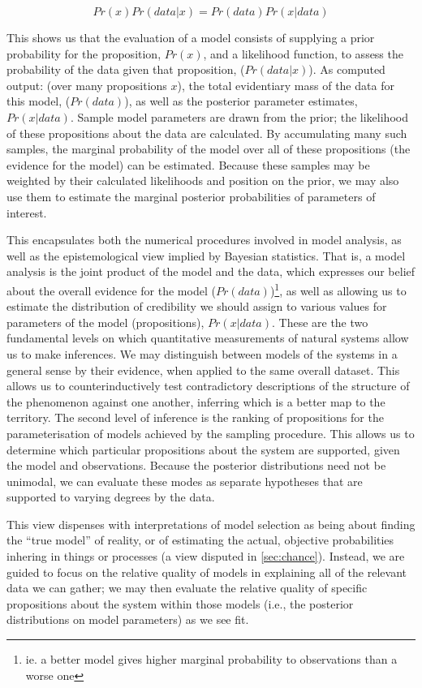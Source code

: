 \[Pr(x)Pr(data|x) = Pr(data)Pr(x|data)\]

This shows us that the evaluation of a model consists of supplying a prior probability for the proposition, $Pr(x)$, and a likelihood function, to assess the probability of the data given that proposition, ($Pr(data|x)$). As computed output: (over many propositions $x$), the total evidentiary mass of the data for this model, ($Pr(data)$), as well as the posterior parameter estimates, $Pr(x|data)$. Sample model parameters are drawn from the prior; the likelihood of these propositions about the data are calculated. By accumulating many such samples, the marginal probability of the model over all of these propositions (the evidence for the model) can be estimated. Because these samples may be weighted by their calculated likelihoods and position on the prior, we may also use them to estimate the marginal posterior probabilities of parameters of interest. 

This encapsulates both the numerical procedures involved in model analysis, as well as the epistemological view implied by Bayesian statistics. That is, a model analysis is the joint product of the model and the data, which expresses our belief about the overall evidence for the model ($Pr(data)$)\footnote{ie. a better model gives higher marginal probability to observations than a worse one}, as well as allowing us to estimate the distribution of credibility we should assign to various values for parameters of the model (propositions), $Pr(x|data)$. These are the two fundamental levels on which quantitative measurements of natural systems allow us to make inferences. We may distinguish between models of the systems in a general sense by their evidence, when applied to the same overall dataset. This allows us to counterinductively test contradictory descriptions of the structure of the phenomenon against one another, inferring which is a better map to the territory. The second level of inference is the ranking of propositions for the parameterisation of models achieved by the sampling procedure. This allows us to determine which particular propositions about the system are supported, given the model and observations. Because the posterior distributions need not be unimodal, we can evaluate these modes as separate hypotheses that are supported to varying degrees by the data. 

This view dispenses with interpretations of model selection as being about finding the ``true model'' of reality, or of estimating the actual, objective probabilities inhering in things or processes (a view disputed in \autoref{sec:chance}). Instead, we are guided to focus on the relative quality of models in explaining all of the relevant data we can gather; we may then evaluate the relative quality of specific propositions about the system within those models (i.e., the posterior distributions on model parameters) as we see fit.  

